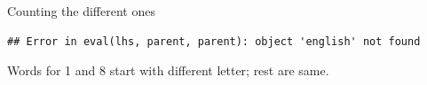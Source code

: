\documentclass[ignorenonframetext,]{beamer}
\newenvironment{Shaded}{\begin{snugshade}}{\end{snugshade}}
\newcommand{\DataTypeTok}[1]{\textcolor[rgb]{0.13,0.29,0.53}{#1}}
\newcommand{\KeywordTok}[1]{\textcolor[rgb]{0.13,0.29,0.53}{\textbf{#1}}}
\newcommand{\NormalTok}[1]{#1}
\newcommand{\OperatorTok}[1]{\textcolor[rgb]{0.81,0.36,0.00}{\textbf{#1}}}
\newcommand{\StringTok}[1]{\textcolor[rgb]{0.31,0.60,0.02}{#1}}
\begin{document}
\begin{frame}[fragile]{Counting the different ones}
\protect\hypertarget{counting-the-different-ones}{}

\begin{Shaded}
\end{Shaded}

\begin{verbatim}
## Error in eval(lhs, parent, parent): object 'english' not found
\end{verbatim}

Words for 1 and 8 start with different letter; rest are same.

\end{frame}
\end{document}
